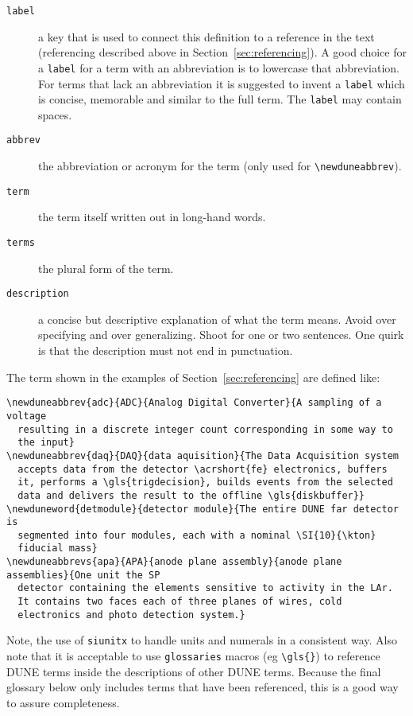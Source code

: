 \documentclass{article}
\begin{document}
\begin{description}
\item[\texttt{label}] a key that is used to connect this definition to
  a reference in the text (referencing described above in
  Section~\ref{sec:referencing}). 
  A good choice for a \texttt{label} for a term with an abbreviation
  is to lowercase that abbreviation. 
  For terms that lack an abbreviation it is suggested to invent a
  \texttt{label} which is concise, memorable and similar to the full
  term.
  The \texttt{label} may contain spaces.
\item[\texttt{abbrev}] the abbreviation or acronym for the term (only used for \verb|\newduneabbrev|).
\item[\texttt{term}] the  term itself written out in
  long-hand words.
\item[\texttt{terms}] the plural form of the  term.
\item[\texttt{description}] a concise but descriptive explanation of
  what the term means. 
  Avoid over specifying and over generalizing. 
  Shoot for one or two sentences. 
  One quirk is that the description must not end in punctuation. 
\end{description}

The term shown in the examples of Section~\ref{sec:referencing} are
defined like:

\begin{verbatim}
\newduneabbrev{adc}{ADC}{Analog Digital Converter}{A sampling of a voltage
  resulting in a discrete integer count corresponding in some way to
  the input}
\newduneabbrev{daq}{DAQ}{data aquisition}{The Data Acquisition system
  accepts data from the detector \acrshort{fe} electronics, buffers
  it, performs a \gls{trigdecision}, builds events from the selected
  data and delivers the result to the offline \gls{diskbuffer}}
\newduneword{detmodule}{detector module}{The entire DUNE far detector is
  segmented into four modules, each with a nominal \SI{10}{\kton}
  fiducial mass}
\newduneabbrevs{apa}{APA}{anode plane assembly}{anode plane assemblies}{One unit the SP
  detector containing the elements sensitive to activity in the LAr. 
  It contains two faces each of three planes of wires, cold
  electronics and photo detection system.} 
\end{verbatim}

Note, the use of \texttt{siunitx} to handle units and numerals in a
consistent way.
Also note that it is acceptable to use \texttt{glossaries} macros (eg
\verb|\gls{}|) to reference DUNE terms inside the descriptions of
other DUNE terms. 
Because the final glossary below only includes terms that have been
referenced, this is a good way to assure completeness.
 



\cleardoublepage
\printglossaries
\end{document}
